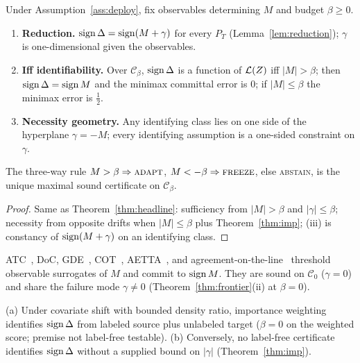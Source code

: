 \begin{theorem}\label{thm:frontier}\label{thm:headline}
Under Assumption~\ref{ass:deploy}, fix observables determining $M$ and budget $\beta\ge0$.
\begin{enumerate}
\item[\textnormal{(i)}] \textbf{Reduction.} $\operatorname{sign}\Delta=\operatorname{sign}(M+\gamma)$ for every $P_T$
(Lemma~\ref{lem:reduction}); $\gamma$ is one-dimensional given the observables.
\item[\textnormal{(ii)}] \textbf{Iff identifiability.} Over $\mathcal{C}_\beta$,
$\operatorname{sign}\Delta$ is a function of $\mathcal{L}(Z)$ iff $|M|>\beta$; then $\operatorname{sign}\Delta=\operatorname{sign} M$ and the
minimax committal error is $0$; if $|M|\le\beta$ the minimax error is $\tfrac12$.
\item[\textnormal{(iii)}] \textbf{Necessity geometry.} Any identifying class lies on one side of
the hyperplane $\gamma=-M$; every identifying assumption is a one-sided constraint on $\gamma$.
\end{enumerate}
The three-way rule $M>\beta\Rightarrow\textsc{adapt}$, $M<-\beta\Rightarrow\textsc{freeze}$,
else \textsc{abstain}, is the unique maximal sound certificate on $\mathcal{C}_\beta$.
\end{theorem}
\begin{proof}
Same as Theorem~\ref{thm:headline}: sufficiency from $|M|>\beta$ and $|\gamma|\le\beta$;
necessity from opposite drifts when $|M|\le\beta$ plus Theorem~\ref{thm:imp}; (iii) is
constancy of $\operatorname{sign}(M+\gamma)$ on an identifying class.
\end{proof}

\begin{remark}[$\beta=0$ face: prior label-free heuristics]\label{rem:beta-zero}
ATC~\cite{garg2022atc}, DoC, GDE~\cite{jiang2022gde}, COT~\cite{lu2023cot},
AETTA~\cite{lee2024aetta}, and agreement-on-the-line~\cite{baek2022aol,kim2024taol} threshold
observable surrogates of $M$ and commit to $\operatorname{sign} M$. They are sound on $\mathcal{C}_0$
($\gamma=0$) and share the failure mode $\gamma\neq0$ (Theorem~\ref{thm:frontier}(ii) at
$\beta=0$).
\end{remark}

\begin{corollary}\label{cor:knowable-regimes}\label{thm:pos}
\textnormal{(a)} Under covariate shift with bounded density ratio, importance weighting
identifies $\operatorname{sign}\Delta$ from labeled source plus unlabeled target ($\beta=0$ on the weighted
score; premise not label-free testable). \textnormal{(b)} Conversely, no label-free certificate
identifies $\operatorname{sign}\Delta$ without a supplied bound on $|\gamma|$ (Theorem~\ref{thm:imp}).
\end{corollary}


